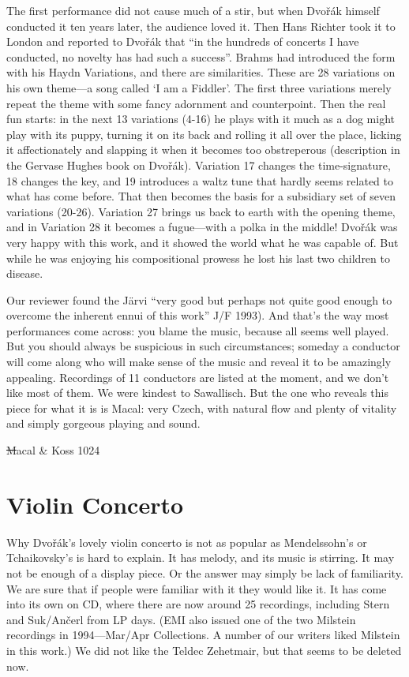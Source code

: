 \documentclass[12pt]{article}%
\begin{document}
The first performance did not cause much of a stir, but when  Dvořák himself conducted it ten years later, the audience loved it. Then Hans Richter took it to London and reported to  Dvořák that ``in the hundreds of concerts I have conducted, no novelty has had such a success''.
Brahms had introduced the form with his Haydn Variations, and there are similarities.
These are 28 variations on his own theme—a song called `I am a Fiddler'. The first three variations merely repeat the theme with some fancy adornment and counterpoint.
Then the real fun starts: in the next 13 variations (4-16) he plays with it much as a dog might play with its puppy, turning it on its back and rolling it all over the place, licking it affectionately and slapping it when it becomes too obstreperous (description in the Gervase Hughes book on  Dvořák). Variation 17 changes the time-signature, 18 changes the key, and 19
introduces a waltz tune that hardly seems
related to what has come before. That then becomes the basis for a subsidiary set of seven variations (20-26). Variation 27 brings us back to earth with the opening theme, and in Variation 28 it becomes a fugue---with a polka in the middle!  Dvořák was very happy with this work, and it showed the world what he was capable of. But while he was enjoying his compositional prowess he lost his last two children to disease.

Our reviewer found the Järvi ``very good but perhaps not quite good enough to overcome the inherent ennui of this work'' J/F 1993). And that's the way most performances come across: you blame the music, because all seems well played. But you should always be suspicious in such circumstances; someday a conductor will come along who will make sense of the music and reveal it to be amazingly appealing. Recordings of 11 conductors are listed at the moment, and we don't like most of them. We were kindest to Sawallisch. But the one who reveals this piece for what it is is Macal: very Czech, with natural flow and plenty of vitality and simply gorgeous playing and sound.

\st
Macal & Koss 1024
\et

\section{Violin Concerto}

Why  Dvořák's lovely violin concerto is not as popular as Mendelssohn's or Tchaikovsky's is hard to explain. It has melody, and its music is stirring. It may not be enough of a display piece. Or the answer may simply be lack of familiarity. We are sure that if people were familiar with it they would like it. It has come into its own on CD, where there are now around 25 recordings, including Stern and Suk/Ančerl from LP days. (EMI also issued one of the two Milstein recordings in 1994---Mar/Apr Collections. A number of our writers liked Milstein in this work.) We did not like the Teldec Zehetmair, but that seems to be deleted now.
\end{document}
